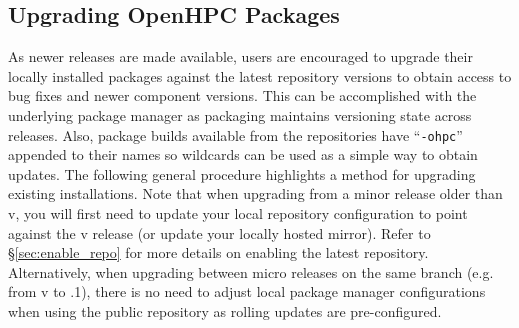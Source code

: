 \subsection{Upgrading OpenHPC Packages}  \label{appendix:upgrade}


As newer \OHPC{} releases are made available, users are encouraged to upgrade
their locally installed packages against the latest repository versions to
obtain access to bug fixes and newer component versions. This can be
accomplished with the underlying package manager as \OHPC{} packaging maintains
versioning state across releases. Also, package builds available from the
\OHPC{} repositories have ``\texttt{-ohpc}'' appended to their names so
wildcards can be used as a simple way to obtain updates. The following general
procedure highlights a method for upgrading existing installations.  Note that
when upgrading from a minor release older than v\OHPCVerTree{}, you will first
need to update your local \OHPC{} repository configuration to point against the
v\OHPCVerTree{} release (or update your locally hosted mirror). Refer to
\S\ref{sec:enable_repo} for more details on enabling the latest
repository. Alternatively, when upgrading between micro releases on the same
branch (e.g. from v\OHPCVerTree{} to \OHPCVerTree{}.1), there is no need to
adjust local package manager configurations when using the public repository as
rolling updates are pre-configured.
 
